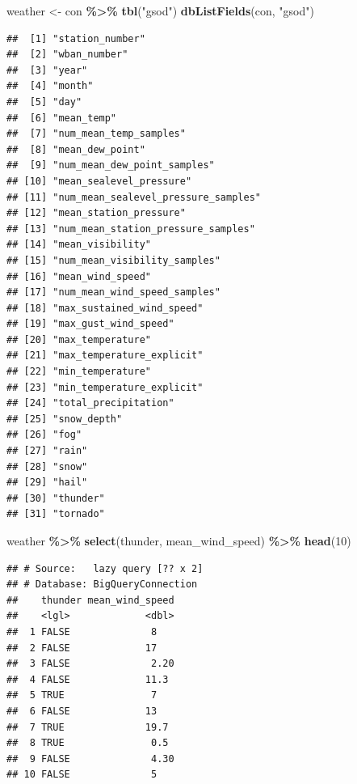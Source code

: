 \documentclass[
]{krantz}
\newenvironment{Shaded}{\begin{snugshade}}{\end{snugshade}}
\newcommand{\DecValTok}[1]{\textcolor[rgb]{0.00,0.00,0.81}{#1}}
\newcommand{\KeywordTok}[1]{\textcolor[rgb]{0.13,0.29,0.53}{\textbf{#1}}}
\newcommand{\NormalTok}[1]{#1}
\newcommand{\OperatorTok}[1]{\textcolor[rgb]{0.81,0.36,0.00}{\textbf{#1}}}
\newcommand{\StringTok}[1]{\textcolor[rgb]{0.31,0.60,0.02}{#1}}
\begin{document}
\begin{Shaded}
\begin{Highlighting}[]
\NormalTok{weather \textless{}{-}}\StringTok{ }\NormalTok{con }\OperatorTok{\%\textgreater{}\%}
\StringTok{  }\KeywordTok{tbl}\NormalTok{(}\StringTok{"gsod"}\NormalTok{)}
\KeywordTok{dbListFields}\NormalTok{(con, }\StringTok{"gsod"}\NormalTok{)}
\end{Highlighting}
\end{Shaded}

\begin{verbatim}
##  [1] "station_number"                    
##  [2] "wban_number"                       
##  [3] "year"                              
##  [4] "month"                             
##  [5] "day"                               
##  [6] "mean_temp"                         
##  [7] "num_mean_temp_samples"             
##  [8] "mean_dew_point"                    
##  [9] "num_mean_dew_point_samples"        
## [10] "mean_sealevel_pressure"            
## [11] "num_mean_sealevel_pressure_samples"
## [12] "mean_station_pressure"             
## [13] "num_mean_station_pressure_samples" 
## [14] "mean_visibility"                   
## [15] "num_mean_visibility_samples"       
## [16] "mean_wind_speed"                   
## [17] "num_mean_wind_speed_samples"       
## [18] "max_sustained_wind_speed"          
## [19] "max_gust_wind_speed"               
## [20] "max_temperature"                   
## [21] "max_temperature_explicit"          
## [22] "min_temperature"                   
## [23] "min_temperature_explicit"          
## [24] "total_precipitation"               
## [25] "snow_depth"                        
## [26] "fog"                               
## [27] "rain"                              
## [28] "snow"                              
## [29] "hail"                              
## [30] "thunder"                           
## [31] "tornado"
\end{verbatim}

\begin{Shaded}
\begin{Highlighting}[]
\NormalTok{weather }\OperatorTok{\%\textgreater{}\%}
\StringTok{  }\KeywordTok{select}\NormalTok{(thunder, mean\_wind\_speed) }\OperatorTok{\%\textgreater{}\%}
\StringTok{  }\KeywordTok{head}\NormalTok{(}\DecValTok{10}\NormalTok{)}
\end{Highlighting}
\end{Shaded}

\begin{verbatim}
## # Source:   lazy query [?? x 2]
## # Database: BigQueryConnection
##    thunder mean_wind_speed
##    <lgl>             <dbl>
##  1 FALSE              8   
##  2 FALSE             17   
##  3 FALSE              2.20
##  4 FALSE             11.3 
##  5 TRUE               7   
##  6 FALSE             13   
##  7 TRUE              19.7 
##  8 TRUE               0.5 
##  9 FALSE              4.30
## 10 FALSE              5
\end{verbatim}
\end{document}
